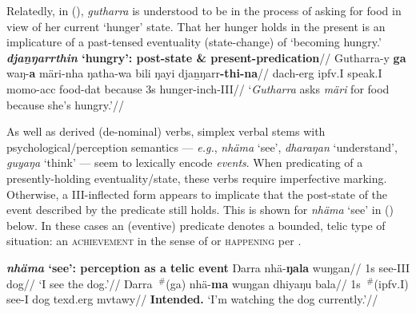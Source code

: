 \xe
Relatedly, in (), \textit{gutharra} is understood to be in the process of asking for food in view of her current `hunger' state. That her hunger holds in the present is an implicature of a past-tensed eventuality (state-change) of `becoming hungry.'
\ex\begingl\glpreamble\textbf{\textit{djaṉŋarrthin} `hungry': post-state \& present-predication}//
\gla Gutharra-y \textbf{ga} waŋ-\textbf{a} märi-nha ŋatha-wa bili ŋayi djaṉŋarr\textbf{-thi-na}//
\glb \gls{da}\gls{ch}-\gls{erg} \gls{ipfv}.\gls{I} speak.\gls{I} \gls{mo}\gls{mo}-\gls{acc} food-\gls{dat} because 3s hunger-\gls{inch}-\gls{III}//
\glft`\textit{Gutharra} asks \textit{märi} for food because she's hungry.'\trailingcitation{[WG~20171208]\footnotemark}//\endgl\xe
{}


As well as derived (de-nominal) verbs, simplex verbal stems with psychological/perception semantics --- \textit{e.g.}, \textit{nhäma} `see', \textit{dharaŋan} `understand', \textit{guyaŋa} `think' --- seem to lexically encode \textit{events}. When predicating of a presently-holding eventuality/state, these verbs require imperfective marking. Otherwise, a \gls{III}-inflected form appears to implicate that the post-state of the event described by the predicate still holds. This is shown for \textit{nhäma} `see' in (\nextx) below. In these cases an (eventive) predicate denotes a bounded, telic type of situation: an \textsc{achievement} in the sense of \citet{Vendler1957} or \textsc{happening} per \citet{Bach1986}. %

\pex\textbf{\textit{nhäma} `see': perception as a telic event}
\a\begingl\gla Ŋarra nhä-\textbf{ŋala} wuŋgan//
\glb 1s see-\gls{III} dog//
\glft`I see the dog.'\trailingcitation{[DB~20190405]}//\endgl
\a\begingl\gla Ŋarra $~^\#$(ga) nhä-\textbf{ma} wuŋgan dhiyaŋu bala//
\glb 1s $~^\#$(\gls{ipfv}.\gls{I}) see-\gls{I} dog \gls{texd}.\gls{erg} \gls{mvtawy}//
\glft\textbf{Intended. }`I'm watching the dog currently.'\trailingcitation{[DB~20190405]}//\endgl\xe


%
%

